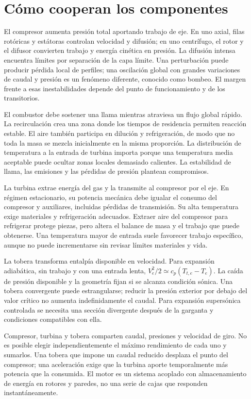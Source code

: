 \section{Cómo cooperan los componentes}
El compresor aumenta presión total aportando trabajo de eje. En uno axial, filas rotóricas y estátoras controlan velocidad y difusión; en uno centrífugo, el rotor y el difusor convierten trabajo y energía cinética en presión. La difusión intensa encuentra límites por separación de la capa límite. Una perturbación puede producir pérdida local de perfiles; una oscilación global con grandes variaciones de caudal y presión es un fenómeno diferente, conocido como bombeo. El margen frente a esas inestabilidades depende del punto de funcionamiento y de los transitorios.

El combustor debe sostener una llama mientras atraviesa un flujo global rápido. La recirculación crea una zona donde los tiempos de residencia permiten reacción estable. El aire también participa en dilución y refrigeración, de modo que no toda la masa se mezcla inicialmente en la misma proporción. La distribución de temperatura a la entrada de turbina importa porque una temperatura media aceptable puede ocultar zonas locales demasiado calientes. La estabilidad de llama, las emisiones y las pérdidas de presión plantean compromisos.

La turbina extrae energía del gas y la transmite al compresor por el eje. En régimen estacionario, su potencia mecánica debe igualar el consumo del compresor y auxiliares, incluidas pérdidas de transmisión. Su alta temperatura exige materiales y refrigeración adecuados. Extraer aire del compresor para refrigerar protege piezas, pero altera el balance de masa y el trabajo que puede obtenerse. Una temperatura mayor de entrada suele favorecer trabajo específico, aunque no puede incrementarse sin revisar límites materiales y vida.

La tobera transforma entalpía disponible en velocidad. Para expansión adiabática, sin trabajo y con una entrada lenta, $V_e^2/2\simeq c_p(T_{t,e}-T_e)$. La caída de presión disponible y la geometría fijan si se alcanza condición sónica. Una tobera convergente puede estrangularse; reducir la presión exterior por debajo del valor crítico no aumenta indefinidamente el caudal. Para expansión supersónica controlada se necesita una sección divergente después de la garganta y condiciones compatibles con ella.

Compresor, turbina y tobera comparten caudal, presiones y velocidad de giro. No es posible elegir independientemente el máximo rendimiento de cada uno y sumarlos. Una tobera que impone un caudal reducido desplaza el punto del compresor; una aceleración exige que la turbina aporte temporalmente más potencia que la consumida. El motor es un sistema acoplado con almacenamiento de energía en rotores y paredes, no una serie de cajas que responden instantáneamente.

